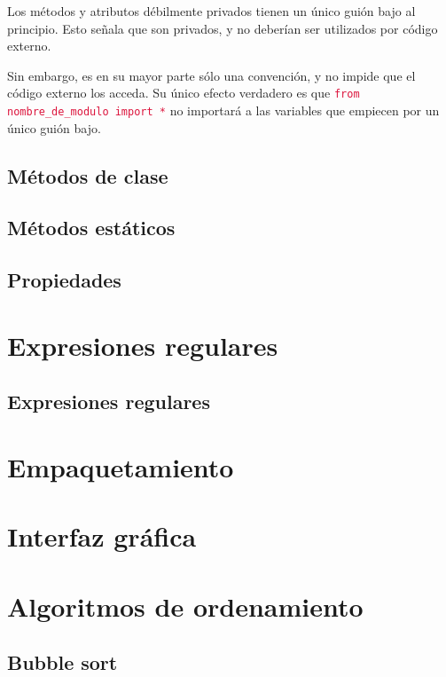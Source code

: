 \documentclass{report}
\newcommand{\ttt}[1]{
  \textcolor{Crimson}{\texttt{#1}}
}
\begin{document}
Los métodos y atributos débilmente privados tienen un único guión bajo al principio. Esto señala que son privados, y no deberían ser utilizados por código externo.\smallskip

Sin embargo, es en su mayor parte sólo una convención, y no impide que el código externo los acceda. Su único efecto verdadero es que \ttt{from nombre\_de\_modulo import *} no importará a las variables que empiecen por un único guión bajo.

\section{Métodos de clase}

\section{Métodos estáticos}

\section{Propiedades}

\clearpage\chapter{Expresiones regulares}

\section{Expresiones regulares}

\clearpage\chapter{Empaquetamiento}

\clearpage\chapter{Interfaz gráfica}

\clearpage\chapter{Algoritmos de ordenamiento}


\section{Bubble sort}
\end{document}
